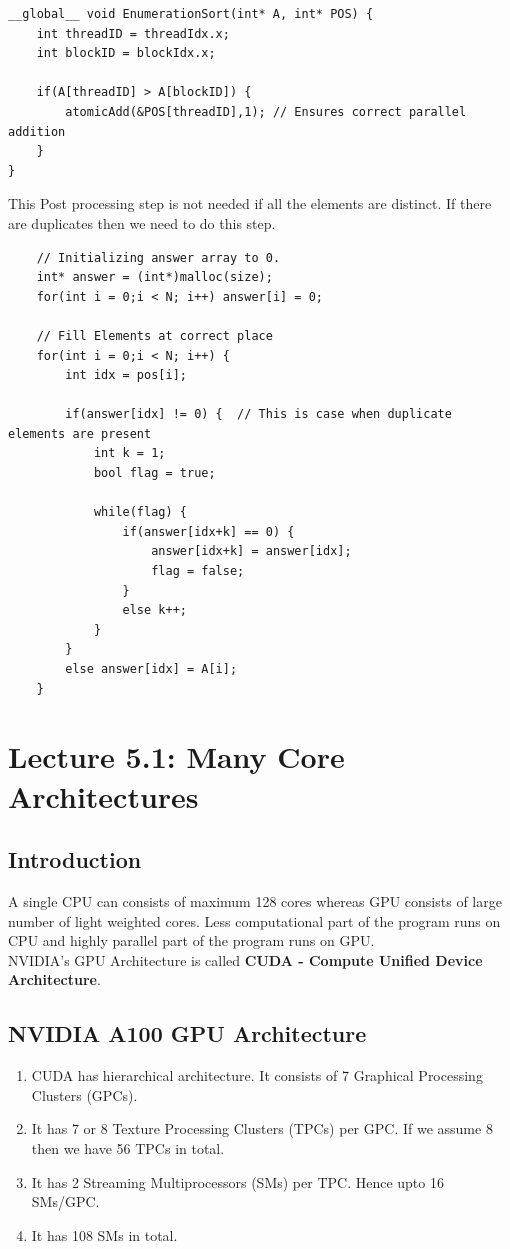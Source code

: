 \documentclass{article}
\begin{document}

\begin{lstlisting}
__global__ void EnumerationSort(int* A, int* POS) {
    int threadID = threadIdx.x;
    int blockID = blockIdx.x;

    if(A[threadID] > A[blockID]) {
        atomicAdd(&POS[threadID],1); // Ensures correct parallel addition
    }
}
\end{lstlisting}

This Post processing step is not needed if all the elements are distinct. If there are duplicates then we need to do this step.

\begin{lstlisting}
    // Initializing answer array to 0.
    int* answer = (int*)malloc(size);
    for(int i = 0;i < N; i++) answer[i] = 0;

    // Fill Elements at correct place
    for(int i = 0;i < N; i++) {
        int idx = pos[i];

        if(answer[idx] != 0) {  // This is case when duplicate elements are present
            int k = 1;
            bool flag = true;

            while(flag) {
                if(answer[idx+k] == 0) {
                    answer[idx+k] = answer[idx];
                    flag = false;
                }
                else k++;
            }
        }
        else answer[idx] = A[i];
    }
\end{lstlisting}

\newpage

\section*{Lecture 5.1: Many Core Architectures}

\subsection*{Introduction}
A single CPU can consists of maximum 128 cores whereas GPU consists of large number of light weighted cores. Less computational part of the program runs on CPU and highly parallel part of the program runs on GPU. \\
NVIDIA's GPU Architecture is called \textbf{CUDA - Compute Unified Device Architecture}.

\subsection*{NVIDIA A100 GPU Architecture} 
\begin{enumerate}
    \item CUDA has hierarchical architecture. It consists of 7 Graphical Processing Clusters (GPCs).
    \item It has 7 or 8 Texture Processing Clusters (TPCs) per GPC. If we assume 8 then we have 56 TPCs in total.
    \item It has 2 Streaming Multiprocessors (SMs) per TPC. Hence upto 16 SMs/GPC.
    \item It has 108 SMs in total.
\end{enumerate}
\end{document}
